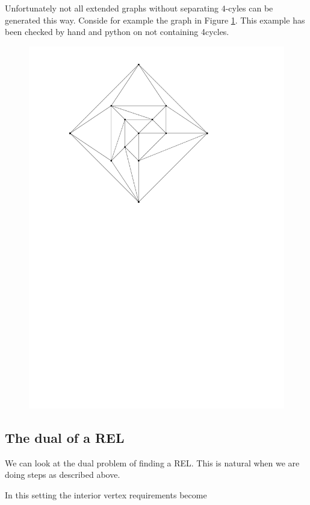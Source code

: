   Unfortunately not all extended graphs without separating $4$-cyles can be generated this way. Conside for example the graph in Figure \ref{fig:ure}. This example has been checked by hand and python on not containing 4cycles.

  \begin{figure}[h]
    \centering
    \includegraphics[scale=1]{NoSeperating4CycleButAdddingEdgeBackInIsBad.pdf}
    \caption{}
    \label{fig:ure}
  \end{figure}


  \subsection{The dual of a REL}
  We can look at the dual problem of finding a REL. This is natural when we are doing steps as described above.


  In this setting the interior vertex requirements become

